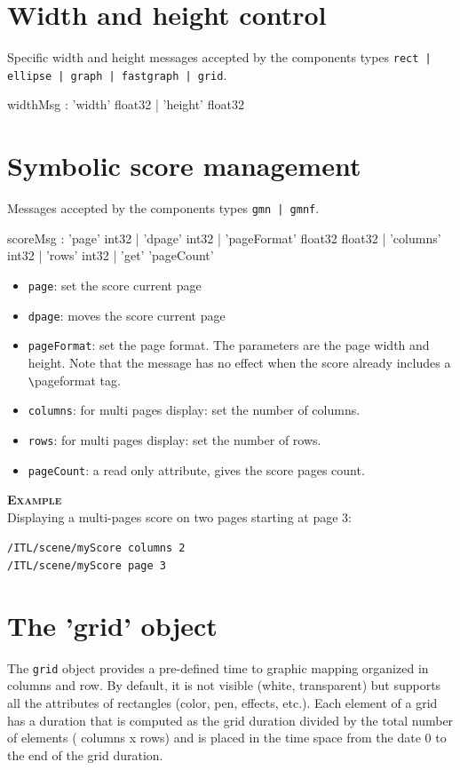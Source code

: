 \documentclass[a4paper,twoside]{report}
\newcommand{\sublevel}[1]	{\section{#1}}
\newcommand{\OSC}[1]		{\texttt{#1}}
\newcommand{\example}		{\textbf{\hspace{-1.5cm}\textbf{\textsc{Example }}}}
\newcommand{\sample}	[1]			{\vspace{-2mm}\begin{center}\colorbox{mygrey}{
								\begin{minipage}[t]{0.9\columnwidth} 
								{\small \texttt{#1}}
								\end{minipage}}\end{center}}
\begin{document}
\sublevel{Width and height control}

Specific width and height messages accepted by the components types \OSC{rect | ellipse | graph | fastgraph | grid}.

\begin{rail}
widthMsg :  'width' float32
			| 'height' float32
\end{rail}



\sublevel{Symbolic score management}
\label{gmnpage}

Messages accepted by the components types \OSC{gmn | gmnf}. 
\begin{rail}
scoreMsg :      'page' int32
			| 'dpage' int32
			| 'pageFormat' float32 float32
			| 'columns' int32
			| 'rows' int32
			| 'get' 'pageCount'
\end{rail}


\begin{itemize}
\item \OSC{page}: set the score current page
\item \OSC{dpage}: moves the score current page
\item \OSC{pageFormat}: set the page format. The parameters are the page width and height. Note that the message has no effect when the score already includes a \verb+\+pageformat tag.
\item \OSC{columns}: for multi pages display: set the number of columns.
\item \OSC{rows}: for multi pages display: set the number of rows.
\item \OSC{pageCount}:  a read only attribute, gives the score pages count.
\end{itemize}

\example \\
Displaying a multi-pages score on two pages starting at page 3:
\sample{/ITL/scene/myScore columns 2 \\
/ITL/scene/myScore page 3
}


\sublevel{The 'grid' object}
\label{grid}

The \OSC{grid} object provides a pre-defined time to graphic mapping organized in columns and row. By default, it is not visible (white, transparent) but supports all the attributes of rectangles (color, pen, effects, etc.). Each element of a grid has a duration that is computed as the grid duration divided by the total number of elements ( columns x rows) and is placed in the time space from the date 0 to the end of the grid duration.
\end{document}
